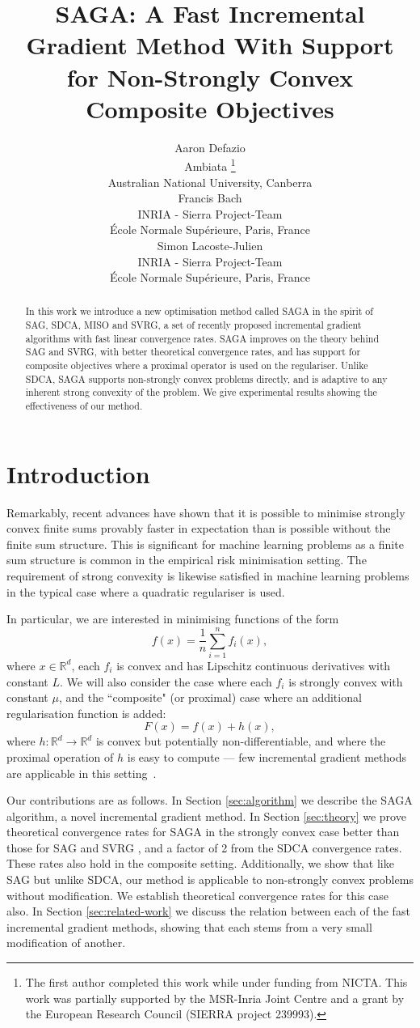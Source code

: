 \documentclass{article}
\title{SAGA: A Fast Incremental Gradient Method With Support for Non-Strongly Convex Composite Objectives}
\author{
Aaron Defazio \\
Ambiata \thanks{The first author completed this work while under funding from NICTA. This work was partially supported by the MSR-Inria Joint Centre and a grant by the European Research Council (SIERRA project 239993).} \\
Australian National University, Canberra\\
\And
Francis Bach \\
INRIA - Sierra Project-Team \\ 
\'Ecole Normale Sup\'erieure, Paris, France \\
\AND
Simon Lacoste-Julien \\
INRIA - Sierra Project-Team \\
\'Ecole Normale Sup\'erieure, Paris, France \\
}
\begin{document}
\maketitle


\begin{abstract}
\vspace{-2mm}
In this work we introduce a new optimisation method called SAGA in the spirit of SAG, SDCA, MISO and SVRG, a set of recently proposed incremental gradient algorithms with fast linear convergence rates. SAGA improves on the theory behind SAG and SVRG, with better theoretical convergence rates, and has support for composite objectives where a proximal operator is used on the regulariser. Unlike SDCA, SAGA supports non-strongly convex problems directly, and is adaptive to any inherent strong convexity of the problem. We give experimental results showing the effectiveness of our method.
\end{abstract}

\section{Introduction}
\label{sec:intro}
\vspace{-2mm}
Remarkably, recent advances \citep{SAG, SDCA} have shown that it is possible to minimise strongly convex finite sums provably faster in expectation than is possible without the finite sum structure. This is significant for machine learning problems as a finite sum structure is common in the empirical risk minimisation setting. The requirement of strong convexity is  likewise satisfied in machine learning problems in the typical case where a quadratic regulariser is used.  

In particular, we are interested in minimising functions of the form
\[
f(x)=\frac{1}{n}\sum_{i=1}^{n}f_{i}(x), 
\]
where $x\in\mathbb{R}^d$, each $f_{i}$ is convex and has Lipschitz continuous derivatives with constant $L$.
We will also consider the case where each $f_{i}$ is strongly convex with constant $\mu$, and the ``composite" (or proximal) case where an additional regularisation function is added:
\[
F(x) = f(x) + h(x),
\]
where $h\colon \mathbb{R}^d \rightarrow \mathbb{R}^d$ is convex but potentially non-differentiable, and where the proximal operation of $h$ is easy to compute --- few incremental gradient methods are applicable in this setting~\citep{jota}\citep{prox-svrg}. %

Our contributions are as follows. In Section \ref{sec:algorithm} we describe the SAGA algorithm, a novel incremental gradient method. In Section \ref{sec:theory} we prove theoretical convergence rates for SAGA in the strongly convex case better than those for SAG \citep{SAG} and SVRG \citep{svrg}, and a factor of 2 from the SDCA \citep{SDCA} convergence rates. These rates also hold in the composite setting. Additionally, we show that like SAG but unlike SDCA, our method is applicable to non-strongly convex problems without modification. We establish theoretical convergence rates for this case also.
In Section \ref{sec:related-work} we discuss the relation between each of the fast incremental gradient methods, showing that each stems from a very small modification of another.
\vspace{-2mm}
\end{document}
